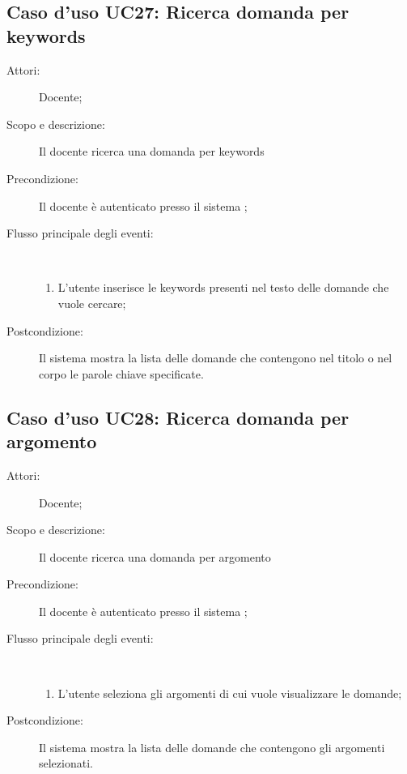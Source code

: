 \subsection{Caso d'uso UC27: Ricerca domanda per keywords}\begin{description}
\item[Attori:] Docente;
\item[Scopo e descrizione:] Il docente  ricerca una domanda per keywords

      \item[Precondizione:] Il docente è autenticato presso il sistema
;

        \item[Flusso principale degli eventi:] \ 
 \begin{enumerate}
          \item L'utente inserisce le keywords presenti nel testo delle domande che vuole cercare;

      \end{enumerate}
    \item[Postcondizione:] Il sistema mostra la lista delle domande che contengono nel titolo o nel corpo le parole chiave specificate.
  \end{description}
\hypertarget{UC28}{}
\subsection{Caso d'uso UC28: Ricerca domanda per argomento}\begin{description}
\item[Attori:] Docente;
\item[Scopo e descrizione:] Il docente ricerca una domanda per argomento
      \item[Precondizione:] Il docente è autenticato presso il sistema
;

        \item[Flusso principale degli eventi:] \ 
 \begin{enumerate}
          \item L'utente seleziona gli argomenti di cui vuole visualizzare le domande;

      \end{enumerate}
    \item[Postcondizione:] Il sistema mostra la lista delle domande che contengono gli argomenti selezionati.
  \end{description}
\hypertarget{UC29}{}
